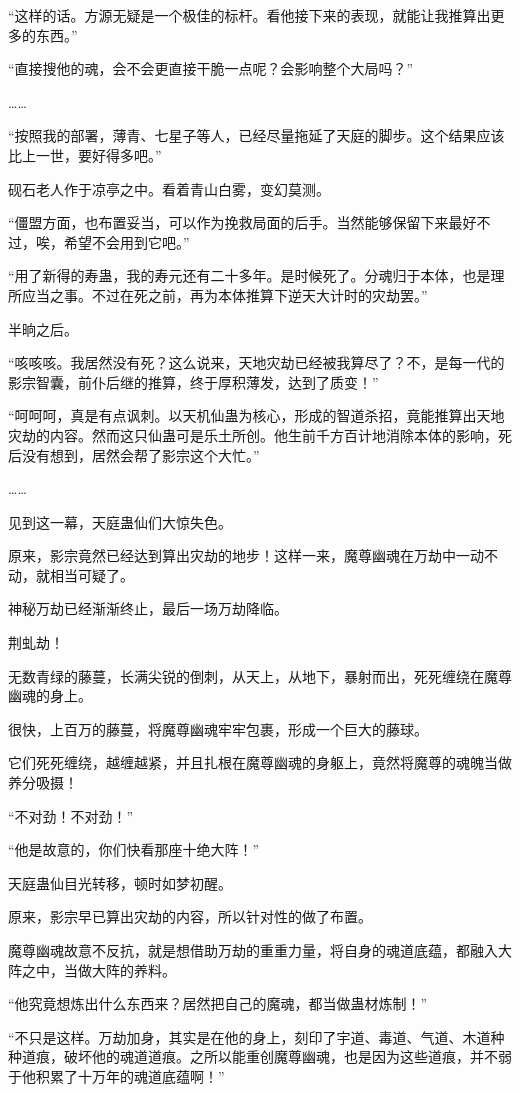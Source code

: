 \begin{this_body}
“这样的话。方源无疑是一个极佳的标杆。看他接下来的表现，就能让我推算出更多的东西。”

“直接搜他的魂，会不会更直接干脆一点呢？会影响整个大局吗？”

……

“按照我的部署，薄青、七星子等人，已经尽量拖延了天庭的脚步。这个结果应该比上一世，要好得多吧。”

砚石老人作于凉亭之中。看着青山白雾，变幻莫测。

“僵盟方面，也布置妥当，可以作为挽救局面的后手。当然能够保留下来最好不过，唉，希望不会用到它吧。”

“用了新得的寿蛊，我的寿元还有二十多年。是时候死了。分魂归于本体，也是理所应当之事。不过在死之前，再为本体推算下逆天大计时的灾劫罢。”

半晌之后。

“咳咳咳。我居然没有死？这么说来，天地灾劫已经被我算尽了？不，是每一代的影宗智囊，前仆后继的推算，终于厚积薄发，达到了质变！”

“呵呵呵，真是有点讽刺。以天机仙蛊为核心，形成的智道杀招，竟能推算出天地灾劫的内容。然而这只仙蛊可是乐土所创。他生前千方百计地消除本体的影响，死后没有想到，居然会帮了影宗这个大忙。”

……

见到这一幕，天庭蛊仙们大惊失色。

原来，影宗竟然已经达到算出灾劫的地步！这样一来，魔尊幽魂在万劫中一动不动，就相当可疑了。

神秘万劫已经渐渐终止，最后一场万劫降临。

荆虬劫！

无数青绿的藤蔓，长满尖锐的倒刺，从天上，从地下，暴射而出，死死缠绕在魔尊幽魂的身上。

很快，上百万的藤蔓，将魔尊幽魂牢牢包裹，形成一个巨大的藤球。

它们死死缠绕，越缠越紧，并且扎根在魔尊幽魂的身躯上，竟然将魔尊的魂魄当做养分吸摄！

“不对劲！不对劲！”

“他是故意的，你们快看那座十绝大阵！”

天庭蛊仙目光转移，顿时如梦初醒。

原来，影宗早已算出灾劫的内容，所以针对性的做了布置。

魔尊幽魂故意不反抗，就是想借助万劫的重重力量，将自身的魂道底蕴，都融入大阵之中，当做大阵的养料。

“他究竟想炼出什么东西来？居然把自己的魔魂，都当做蛊材炼制！”

“不只是这样。万劫加身，其实是在他的身上，刻印了宇道、毒道、气道、木道种种道痕，破坏他的魂道道痕。之所以能重创魔尊幽魂，也是因为这些道痕，并不弱于他积累了十万年的魂道底蕴啊！”


\end{this_body}
